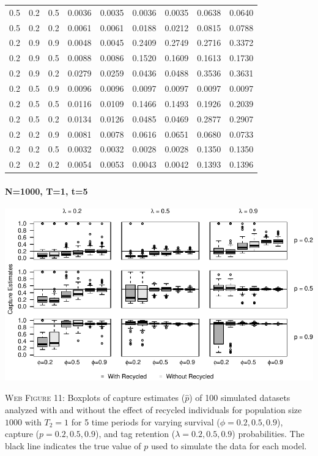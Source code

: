 \documentclass[]{article}
\let\oldparagraph\paragraph
\renewcommand{\paragraph}[1]{\oldparagraph{#1}\mbox{}}
\begin{document}
\begin{table}[ht]
{\begin{tabular}{rrrrrrrrr}
  0.5 & 0.2 & 0.5 & 0.0036 & 0.0035 & 0.0036 & 0.0035 & 0.0638 & 0.0640 \\ 
  0.5 & 0.2 & 0.2 & 0.0061 & 0.0061 & 0.0188 & 0.0212 & 0.0815 & 0.0788 \\ 
  0.2 & 0.9 & 0.9 & 0.0048 & 0.0045 & 0.2409 & 0.2749 & 0.2716 & 0.3372 \\ 
  0.2 & 0.9 & 0.5 & 0.0088 & 0.0086 & 0.1520 & 0.1609 & 0.1613 & 0.1730 \\ 
  0.2 & 0.9 & 0.2 & 0.0279 & 0.0259 & 0.0436 & 0.0488 & 0.3536 & 0.3631 \\ 
  0.2 & 0.5 & 0.9 & 0.0096 & 0.0096 & 0.0097 & 0.0097 & 0.0097 & 0.0097 \\ 
  0.2 & 0.5 & 0.5 & 0.0116 & 0.0109 & 0.1466 & 0.1493 & 0.1926 & 0.2039 \\ 
  0.2 & 0.5 & 0.2 & 0.0134 & 0.0126 & 0.0485 & 0.0469 & 0.2877 & 0.2907 \\ 
  0.2 & 0.2 & 0.9 & 0.0081 & 0.0078 & 0.0616 & 0.0651 & 0.0680 & 0.0733 \\ 
  0.2 & 0.2 & 0.5 & 0.0032 & 0.0032 & 0.0028 & 0.0028 & 0.1350 & 0.1350 \\ 
  0.2 & 0.2 & 0.2 & 0.0054 & 0.0053 & 0.0043 & 0.0042 & 0.1393 & 0.1396 \\ 
   \hline
\end{tabular}
}
\endgroup
\end{table}

\newpage

\paragraph{N=1000, T=1, t=5}\label{n1000-t1-t5-1}

\includegraphics{Appendix_BW_files/figure-latex/figure11_capture_GJSTL5-1.pdf}

\textsc{Web Figure 11:} Boxplots of capture estimates (\(\hat{p}\)) of
100 simulated datasets analyzed with and without the effect of recycled
individuals for population size \(1000\) with \(T_2=1\) for 5 time
periods for varying survival (\(\phi=0.2,0.5,0.9\)), capture
(\(p=0.2,0.5,0.9\)), and tag retention (\(\lambda=0.2,0.5,0.9\))
probabilities. The black line indicates the true value of \(p\) used to
simulate the data for each model.
\end{document}

